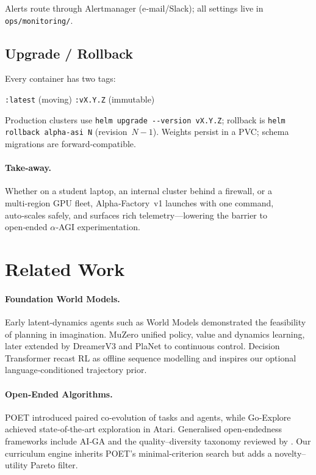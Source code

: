 Alerts route through Alertmanager (e‑mail/Slack);
all settings live in \texttt{ops/monitoring/}.

\subsection{Upgrade / Rollback}

Every container has two tags:

\begin{center}
  \texttt{:latest} (moving) \quad\textbullet\quad \texttt{:vX.Y.Z} (immutable)
\end{center}

Production clusters use \verb|helm upgrade --version vX.Y.Z|;
rollback is \verb|helm rollback alpha-asi N| (revision $N-1$).
Weights persist in a PVC; schema migrations are forward‑compatible.

\paragraph{Take‑away.} Whether on a student laptop, an internal cluster behind a firewall, or a multi‑region GPU fleet, Alpha‑Factory v1 launches with one command, auto‑scales safely, and surfaces rich telemetry—lowering the barrier to open‑ended $\alpha$‑AGI experimentation.

\section{Related Work}\label{sec:related}

\paragraph{Foundation World Models.}
Early latent‐dynamics agents such as World Models \cite{ha2018world}
demonstrated the feasibility of planning in imagination.
MuZero \cite{schrittwieser2019muzero} unified policy, value and dynamics
learning, later extended by DreamerV3 \cite{hafner2023dreamer} and PlaNet
\cite{hafner2019planet} to continuous control.  Decision Transformer
\cite{chen2021decision} recast RL as offline sequence modelling and inspires
our optional language‐conditioned trajectory prior.

\paragraph{Open‐Ended Algorithms.}
POET \cite{wang2019poet} introduced paired co‑evolution of tasks and agents,
while Go‑Explore \cite{ecoffet2020goexplore} achieved state‐of‑the‑art
exploration in Atari.  Generalised open‐endedness frameworks include AI‑GA
\cite{clune2019aiga} and the quality–diversity taxonomy reviewed by
\textcite{pugh2016quality}.  Our curriculum engine inherits POET's
minimal‑criterion search but adds a novelty–utility Pareto filter.

